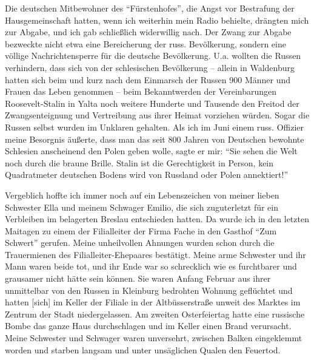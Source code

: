  Die deutschen Mitbewohner des \enquote{Fürstenhofes}, die Angst vor Bestrafung der Hausgemeinschaft hatten, wenn ich weiterhin mein Radio behielte, drängten mich zur Abgabe, und ich gab schließlich widerwillig nach. Der Zwang zur Abgabe bezweckte nicht etwa eine Bereicherung der russ. Bevölkerung, sondern eine völlige Nachrichtensperre für die deutsche Bevölkerung. U.a. wollten die Russen verhindern, dass sich von der schlesischen Bevölkerung -- allein in Waldenburg hatten sich beim und kurz nach dem Einmarsch der Russen 900 Männer und Frauen das Leben genommen -- beim Bekanntwerden der Vereinbarungen Roosevelt-Stalin in Yalta noch weitere Hunderte und Tausende den Freitod der Zwangsenteignung und Vertreibung aus ihrer Heimat vorziehen würden. Sogar die Russen selbst wurden im Unklaren gehalten. Als ich im Juni einem russ. Offizier meine Besorgnis äußerte, dass man das seit 800 Jahren von Deutschen bewohnte Schlesien anscheinend den Polen geben wolle, sagte er mir: \enquote{Sie sehen die Welt noch durch die braune Brille. Stalin ist die Gerechtigkeit  in Person, kein Quadratmeter deutschen Bodens wird von Russland oder Polen annektiert!}

Vergeblich hoffte ich immer noch auf ein Lebenszeichen von meiner lieben Schwester Ella und meinem Schwager Emilio, die sich zuguterletzt für ein Verbleiben im belagerten Breslau entschieden hatten. Da wurde ich in den letzten Maitagen zu einem der Filialleiter der Firma Fache in den Gasthof \enquote{Zum Schwert} gerufen. Meine unheilvollen Ahnungen wurden schon durch die Trauermienen des Filialleiter-Ehepaares bestätigt. Meine arme Schwester und ihr Mann waren beide tot, und ihr Ende war so schrecklich wie es furchtbarer und grausamer nicht hätte sein können. Sie waren Anfang Februar aus ihrer unmittelbar von den Russen in Kleinburg bedrohten Wohnung geflüchtet und hatten [sich] im Keller der Filiale in der Altbüsserstraße unweit des Marktes im Zentrum der Stadt niedergelassen. Am zweiten Osterfeiertag hatte eine russische Bombe das ganze Haus durchschlagen und im Keller einen Brand verursacht. Meine Schwester und Schwager waren unversehrt, zwischen Balken eingeklemmt worden und starben langsam und unter unsäglichen Qualen den Feuertod.

